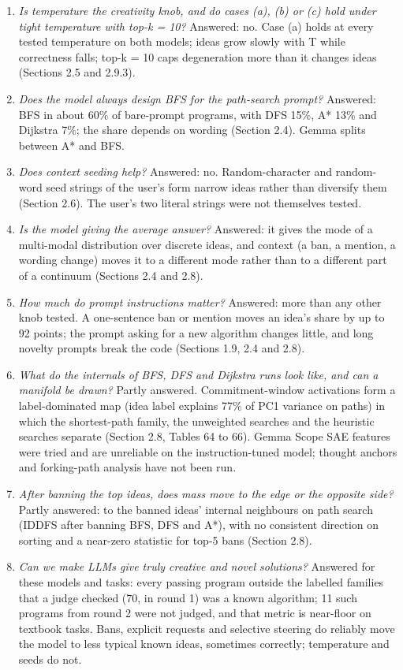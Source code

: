 \documentclass[11pt,letterpaper]{article}
\begin{document}
\begin{enumerate}
\item \emph{Is temperature the creativity knob, and do cases (a), (b) or (c) hold under tight temperature with top-k = 10?} Answered: no. Case (a) holds at every tested temperature on both models; ideas grow slowly with T while correctness falls; top-k = 10 caps degeneration more than it changes ideas (Sections 2.5 and 2.9.3).
\item \emph{Does the model always design BFS for the path-search prompt?} Answered: BFS in about 60\% of bare-prompt programs, with DFS 15\%, A* 13\% and Dijkstra 7\%; the share depends on wording (Section 2.4). Gemma splits between A* and BFS.
\item \emph{Does context seeding help?} Answered: no. Random-character and random-word seed strings of the user's form narrow ideas rather than diversify them (Section 2.6). The user's two literal strings were not themselves tested.
\item \emph{Is the model giving the average answer?} Answered: it gives the mode of a multi-modal distribution over discrete ideas, and context (a ban, a mention, a wording change) moves it to a different mode rather than to a different part of a continuum (Sections 2.4 and 2.8).
\item \emph{How much do prompt instructions matter?} Answered: more than any other knob tested. A one-sentence ban or mention moves an idea's share by up to 92 points; the prompt asking for a new algorithm changes little, and long novelty prompts break the code (Sections 1.9, 2.4 and 2.8).
\item \emph{What do the internals of BFS, DFS and Dijkstra runs look like, and can a manifold be drawn?} Partly answered. Commitment-window activations form a label-dominated map (idea label explains 77\% of PC1 variance on paths) in which the shortest-path family, the unweighted searches and the heuristic searches separate (Section 2.8, Tables 64 to 66). Gemma Scope SAE features were tried and are unreliable on the instruction-tuned model; thought anchors and forking-path analysis have not been run.
\item \emph{After banning the top ideas, does mass move to the edge or the opposite side?} Partly answered: to the banned ideas' internal neighbours on path search (IDDFS after banning BFS, DFS and A*), with no consistent direction on sorting and a near-zero statistic for top-5 bans (Section 2.8).
\item \emph{Can we make LLMs give truly creative and novel solutions?} Answered for these models and tasks: every passing program outside the labelled families that a judge checked (70, in round 1) was a known algorithm; 11 such programs from round 2 were not judged, and that metric is near-floor on textbook tasks. Bans, explicit requests and selective steering do reliably move the model to less typical known ideas, sometimes correctly; temperature and seeds do not.
\end{enumerate}
\end{document}

